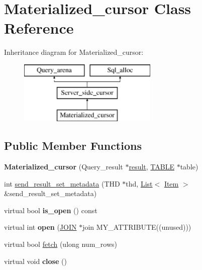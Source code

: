 \hypertarget{classMaterialized__cursor}{}\section{Materialized\+\_\+cursor Class Reference}
\label{classMaterialized__cursor}
Inheritance diagram for Materialized\+\_\+cursor\+:\begin{figure}[H]
\begin{center}
\leavevmode
\includegraphics[height=3.000000cm]{classMaterialized__cursor}
\end{center}
\end{figure}
\subsection*{Public Member Functions}
\begin{DoxyCompactItemize}
\item 
\mbox{\label{classMaterialized__cursor_a14c78fe15c0d024d569070fc9edd85f2}} 
{\bfseries Materialized\+\_\+cursor} (Query\+\_\+result $\ast$\mbox{\hyperlink{classServer__side__cursor_aabbf3cb174ae4f57cc7bfc35f9149c25}{result}}, \mbox{\hyperlink{structTABLE}{T\+A\+B\+LE}} $\ast$table)
\item 
int \mbox{\hyperlink{classMaterialized__cursor_aaad0fe0d3f6b74209f9e6f82e118b621}{send\+\_\+result\+\_\+set\+\_\+metadata}} (T\+HD $\ast$thd, \mbox{\hyperlink{classList}{List}}$<$ \mbox{\hyperlink{classItem}{Item}} $>$ \&send\+\_\+result\+\_\+set\+\_\+metadata)
\item 
\mbox{\label{classMaterialized__cursor_ae515a36bdbdfad49338c56e0df0e97da}} 
virtual bool {\bfseries is\+\_\+open} () const
\item 
\mbox{\label{classMaterialized__cursor_a25710046c4d9f9b1d0ad002010f05785}} 
virtual int {\bfseries open} (\mbox{\hyperlink{classJOIN}{J\+O\+IN}} $\ast$join M\+Y\+\_\+\+A\+T\+T\+R\+I\+B\+U\+TE((unused)))
\item 
virtual bool \mbox{\hyperlink{classMaterialized__cursor_a1536d980f3500d1c52070c8ef09a7423}{fetch}} (ulong num\+\_\+rows)
\item 
\mbox{\label{classMaterialized__cursor_a34dc2e3eb7ab0adfde89ecdd3bbb84bf}} 
virtual void {\bfseries close} ()
\end{DoxyCompactItemize}
